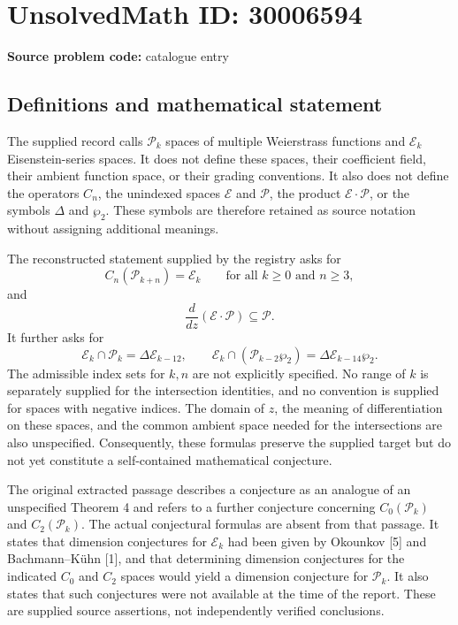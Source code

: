 \documentclass[11pt]{article}
\begin{document}
\section*{UnsolvedMath ID: 30006594}
\textbf{Source problem code:} catalogue entry
\subsection{Definitions and mathematical statement}
The supplied record calls \(\mathcal P_k\) spaces of multiple Weierstrass functions and \(\mathcal E_k\) Eisenstein-series spaces. It does not define these spaces, their coefficient field, their ambient function space, or their grading conventions. It also does not define the operators \(C_n\), the unindexed spaces \(\mathcal E\) and \(\mathcal P\), the product \(\mathcal E\cdot\mathcal P\), or the symbols \(\Delta\) and \(\wp_2\). These symbols are therefore retained as source notation without assigning additional meanings.

The reconstructed statement supplied by the registry asks for
\[
 C_n(\mathcal P_{k+n})=\mathcal E_k
 \qquad\text{for all }k\geq0\text{ and }n\geq3,
\]
and
\[
 \frac{d}{dz}(\mathcal E\cdot\mathcal P)\subseteq\mathcal P.
\]
It further asks for
\[
 \mathcal E_k\cap\mathcal P_k=\Delta\mathcal E_{k-12},
 \qquad
 \mathcal E_k\cap(\mathcal P_{k-2}\wp_2)
   =\Delta\mathcal E_{k-14}\wp_2.
\]
The admissible index sets for \(k,n\) are not explicitly specified. No range of \(k\) is separately supplied for the intersection identities, and no convention is supplied for spaces with negative indices. The domain of \(z\), the meaning of differentiation on these spaces, and the common ambient space needed for the intersections are also unspecified. Consequently, these formulas preserve the supplied target but do not yet constitute a self-contained mathematical conjecture.

The original extracted passage describes a conjecture as an analogue of an unspecified Theorem 4 and refers to a further conjecture concerning \(C_0(\mathcal P_k)\) and \(C_2(\mathcal P_k)\). The actual conjectural formulas are absent from that passage. It states that dimension conjectures for \(\mathcal E_k\) had been given by Okounkov [5] and Bachmann--K\"uhn [1], and that determining dimension conjectures for the indicated \(C_0\) and \(C_2\) spaces would yield a dimension conjecture for \(\mathcal P_k\). It also states that such conjectures were not available at the time of the report. These are supplied source assertions, not independently verified conclusions.
\end{document}
